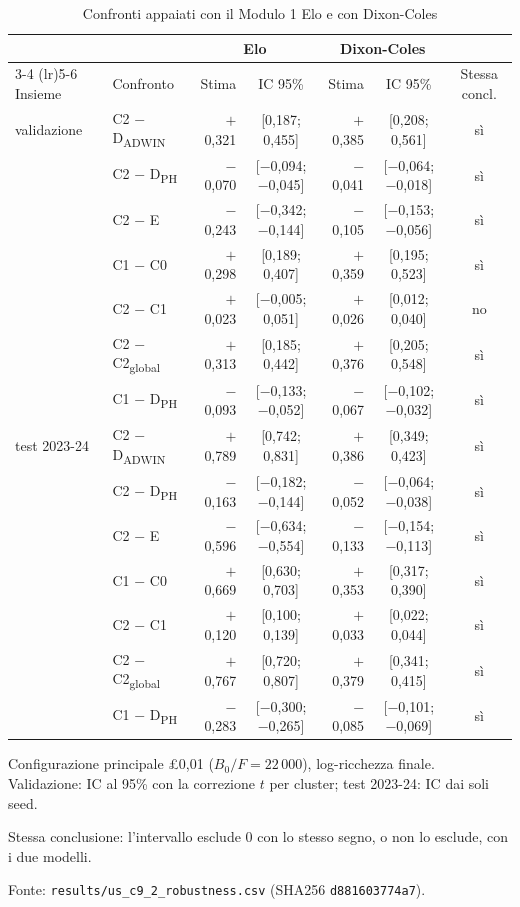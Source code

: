 \begin{table}[htbp]
\centering
\small
\setlength{\tabcolsep}{4pt}
\caption{Confronti appaiati con il Modulo 1 Elo e con Dixon-Coles}
\label{tab:confronti_dc}
\begin{tabular}{llrcrcc}
\toprule
 &  & \multicolumn{2}{c}{Elo} & \multicolumn{2}{c}{Dixon-Coles} &  \\
\cmidrule(lr){3-4} \cmidrule(lr){5-6}
Insieme & Confronto & Stima & IC 95\% & Stima & IC 95\% & Stessa concl. \\
\midrule
validazione & C2 $-$ D\textsubscript{ADWIN} & $+$0,321 & [0,187; 0,455] & $+$0,385 & [0,208; 0,561] & sì \\
 & C2 $-$ D\textsubscript{PH} & $-$0,070 & [$-$0,094; $-$0,045] & $-$0,041 & [$-$0,064; $-$0,018] & sì \\
 & C2 $-$ E & $-$0,243 & [$-$0,342; $-$0,144] & $-$0,105 & [$-$0,153; $-$0,056] & sì \\
 & C1 $-$ C0 & $+$0,298 & [0,189; 0,407] & $+$0,359 & [0,195; 0,523] & sì \\
 & C2 $-$ C1 & $+$0,023 & [$-$0,005; 0,051] & $+$0,026 & [0,012; 0,040] & no \\
 & C2 $-$ C2\textsubscript{global} & $+$0,313 & [0,185; 0,442] & $+$0,376 & [0,205; 0,548] & sì \\
 & C1 $-$ D\textsubscript{PH} & $-$0,093 & [$-$0,133; $-$0,052] & $-$0,067 & [$-$0,102; $-$0,032] & sì \\
\midrule
test 2023-24 & C2 $-$ D\textsubscript{ADWIN} & $+$0,789 & [0,742; 0,831] & $+$0,386 & [0,349; 0,423] & sì \\
 & C2 $-$ D\textsubscript{PH} & $-$0,163 & [$-$0,182; $-$0,144] & $-$0,052 & [$-$0,064; $-$0,038] & sì \\
 & C2 $-$ E & $-$0,596 & [$-$0,634; $-$0,554] & $-$0,133 & [$-$0,154; $-$0,113] & sì \\
 & C1 $-$ C0 & $+$0,669 & [0,630; 0,703] & $+$0,353 & [0,317; 0,390] & sì \\
 & C2 $-$ C1 & $+$0,120 & [0,100; 0,139] & $+$0,033 & [0,022; 0,044] & sì \\
 & C2 $-$ C2\textsubscript{global} & $+$0,767 & [0,720; 0,807] & $+$0,379 & [0,341; 0,415] & sì \\
 & C1 $-$ D\textsubscript{PH} & $-$0,283 & [$-$0,300; $-$0,265] & $-$0,085 & [$-$0,101; $-$0,069] & sì \\
\bottomrule
\end{tabular}

\smallskip
\begin{minipage}{\linewidth}
\footnotesize
Configurazione principale \pounds{}0,01 ($B_0/F = 22\,000$), log-ricchezza finale. Validazione: IC al 95\% con la correzione $t$ per cluster; test 2023-24: IC dai soli seed.\par
Stessa conclusione: l'intervallo esclude 0 con lo stesso segno, o non lo esclude, con i due modelli.\par
Fonte: \texttt{results/us\_c9\_2\_robustness.csv} (SHA256 \texttt{d881603774a7}).
\end{minipage}
\end{table}
